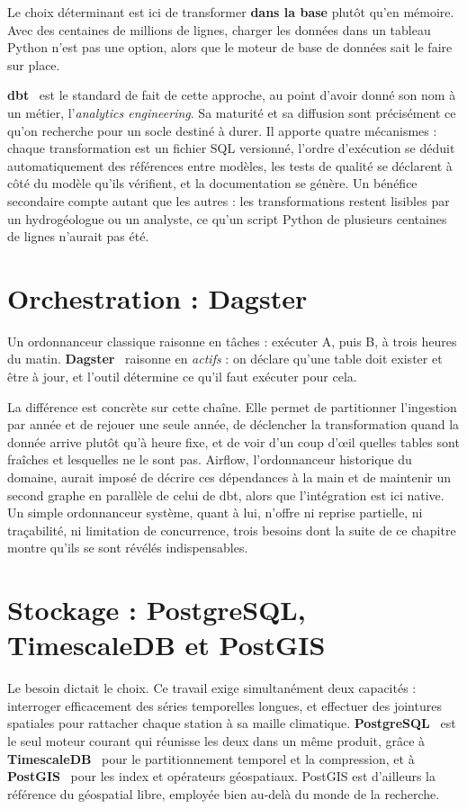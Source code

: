 Le choix déterminant est ici de transformer \textbf{dans la base} plutôt qu'en mémoire. Avec des
centaines de millions de lignes, charger les données dans un tableau Python n'est pas une
option, alors que le moteur de base de données sait le faire sur place.

\textbf{dbt}~\cite{dbt} est le standard de fait de cette approche, au point d'avoir donné son nom
à un métier, l'\emph{analytics engineering}. Sa maturité et sa diffusion sont précisément ce
qu'on recherche pour un socle destiné à durer. Il apporte quatre mécanismes : chaque
transformation est un fichier SQL versionné, l'ordre d'exécution se déduit automatiquement des
références entre modèles, les tests de qualité se déclarent à côté du modèle qu'ils vérifient,
et la documentation se génère. Un bénéfice secondaire compte autant que les autres : les
transformations restent lisibles par un hydrogéologue ou un analyste, ce qu'un script Python de
plusieurs centaines de lignes n'aurait pas été.

\section{Orchestration : Dagster}

Un ordonnanceur classique raisonne en tâches : exécuter A, puis B, à trois heures du matin.
\textbf{Dagster}~\cite{dagster} raisonne en \emph{actifs} : on déclare qu'une table doit exister
et être à jour, et l'outil détermine ce qu'il faut exécuter pour cela.

La différence est concrète sur cette chaîne. Elle permet de partitionner l'ingestion par année
et de rejouer une seule année, de déclencher la transformation quand la donnée arrive plutôt
qu'à heure fixe, et de voir d'un coup d'œil quelles tables sont fraîches et lesquelles ne le
sont pas. Airflow, l'ordonnanceur historique du domaine, aurait imposé de décrire ces
dépendances à la main et de maintenir un second graphe en parallèle de celui de dbt, alors que
l'intégration est ici native. Un simple ordonnanceur système, quant à lui, n'offre ni reprise
partielle, ni traçabilité, ni limitation de concurrence, trois besoins dont
la suite de ce chapitre montre qu'ils se sont révélés indispensables.

\section{Stockage : PostgreSQL, TimescaleDB et PostGIS}

Le besoin dictait le choix. Ce travail exige simultanément deux capacités : interroger
efficacement des séries temporelles longues, et effectuer des jointures spatiales pour rattacher
chaque station à sa maille climatique. \textbf{PostgreSQL}~\cite{postgresql} est le seul moteur
courant qui réunisse les deux dans un même produit, grâce à \textbf{TimescaleDB}~\cite{timescaledb}
pour le partitionnement temporel et la compression, et à \textbf{PostGIS}~\cite{postgis} pour les
index et opérateurs géospatiaux. PostGIS est d'ailleurs la référence du géospatial libre, employée
bien au-delà du monde de la recherche.

